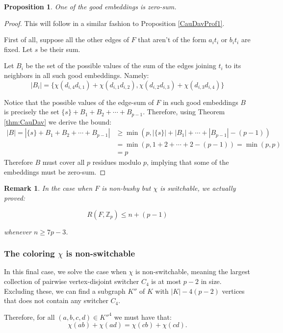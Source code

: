 \documentclass{article}
\numberwithin{table}{section}
\newtheorem{prop}[theorem]{Proposition}
\newtheorem{rem}[theorem]{Remark}
\begin{document}
\begin{prop}\label{CauDevProf2}
    One of the good embeddings is zero-sum.
\end{prop}
\begin{proof}
    This will follow in a similar fashion to Proposition \ref{CauDavProf1}. 

    First of all, suppose all the other edges of $F$ that aren't of the form $a_it_i$ or $b_it_i$ are fixed. Let $s$ be their sum. 

    Let $B_i$ be the set of the possible values of the sum of the edges joining $t_i$ to its neighbors in all such good embeddings. Namely:
    $$|B_i| = \{\chi(d_{i,4}d_{i,1})+\chi(d_{i,1}d_{i,2}) ,\chi(d_{i,2}d_{i,3})+\chi(d_{i,3}d_{i,4})\}$$

    Notice that the possible values of the edge-sum of $F$ in such good embeddings $B$ is precisely the set $\{s\}+B_1+B_2+\cdots +B_{p-1}$. Therefore, using Theorem \ref{thm:CauDav} we derive the bound:
\begin{align*}
    |B|= |\{s\}+B_1+B_2+\cdots +B_{p-1}|&\geq \min (p,|\{s\}|+|B_1|+\cdots+|B_{p-1}|-(p-1)) \\&= \min(p,1+2+\cdots+2-(p-1)) = \min(p,p) \\&= p
\end{align*}
    Therefore $B$ must cover all $p$ residues modulo $p$, implying that some of the embeddings must be zero-sum.
\end{proof}
\begin{rem}\label{refnbushyswitch}
    In the case when $F$ is non-bushy but $\chi$ is switchable, we actually proved:

    $$R(F,\mathbb{Z}_p)\leq n+(p-1)$$

    whenever $n\geq 7p-3$.
\end{rem}
\subsubsection{The coloring $\chi$ is non-switchable}\label{subsec: non switch}

In this final case, we solve the case when $\chi$ is non-switchable, meaning the largest collection of pairwise vertex-disjoint switcher $C_4$ is at most $p-2$ in size. Excluding these, we can find a subgraph $K''$ of $K$ with $|K|-4(p-2)$ vertices that does not contain any switcher $C_4$.

Therefore, for all $(a,b,c,d) \in K''^4$ we must have that:
\begin{equation}\label{nonswitcheq}
    \chi(ab)+\chi(ad) = \chi (cb)+\chi(cd).
\end{equation}
\end{document}
